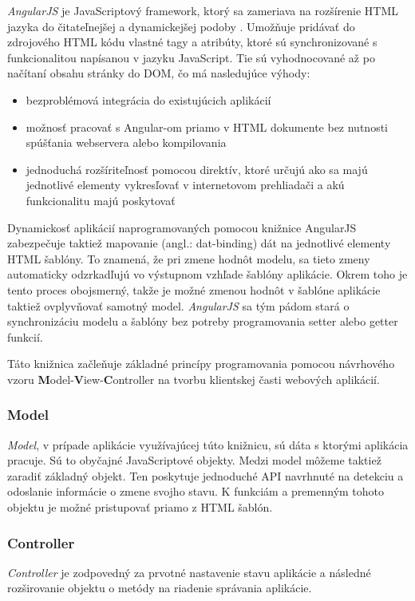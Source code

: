 \textit{AngularJS} je JavaScriptový framework, ktorý sa zameriava na rozšírenie HTML jazyka do čitateľnejšej a dynamickejšej podoby \cite{jain2015angularjs}. Umožňuje pridávať do zdrojového HTML kódu vlastné tagy a atribúty, ktoré sú synchronizované s funkcionalitou napísanou v jazyku JavaScript. Tie sú vyhodnocované až po načítaní obsahu stránky do DOM, čo má nasledujúce výhody:
\begin{itemize}
	\item bezproblémová integrácia do existujúcich aplikácií 
	\item možnosť pracovať s Angular-om priamo v HTML dokumente bez nutnosti spúšťania webservera alebo kompilovania
	\item jednoduchá rozšíriteľnosť pomocou direktív, ktoré určujú ako sa majú jednotlivé elementy vykresľovať v internetovom prehliadači a akú funkcionalitu majú poskytovať
\end{itemize}

Dynamickosť aplikácií naprogramovaných pomocou knižnice AngularJS zabezpečuje taktiež mapovanie (angl.: dat-binding) dát na jednotlivé elementy HTML šablóny. To znamená, že pri zmene hodnôt modelu, sa tieto zmeny automaticky odzrkadľujú vo výstupnom vzhľade šablóny aplikácie. Okrem toho je tento proces obojsmerný, takže je možné zmenou hodnôt v šablóne aplikácie taktiež ovplyvňovať samotný model. \textit{AngularJS} sa tým pádom stará o synchronizáciu modelu a šablóny bez potreby programovania setter alebo getter funkcií.

Táto knižnica začleňuje základné princípy programovania pomocou návrhového vzoru \textbf{M}odel-\textbf{V}iew-\textbf{C}ontroller na tvorbu klientskej časti webových aplikácií.

\subsubsection{Model}
\textit{Model}, v prípade aplikácie využívajúcej túto knižnicu, sú dáta s ktorými aplikácia pracuje. Sú to obyčajné JavaScriptové objekty. Medzi model môžeme taktiež zaradiť základný  objekt. Ten poskytuje jednoduché API navrhnuté na detekciu a odoslanie informácie o zmene svojho stavu. K funkciám a premenným tohoto objektu je možné pristupovať priamo z HTML šablón.

\subsubsection{Controller}
\textit{ Controller} je zodpovedný za prvotné nastavenie stavu aplikácie a následné rozširovanie  objektu o metódy na riadenie správania aplikácie.

